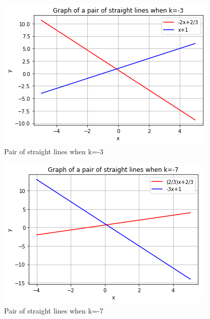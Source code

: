 \documentclass[journal,13pt,twocolumn]{IEEEtran}
\begin{document}
\begin{figure}[!htb]
   \centering
   \includegraphics[width=\columnwidth]{fig1.png}
   \caption{Pair of straight lines when k=-3}
   \label{fig:1}
\end{figure}
\begin{figure}[!htb]
   \includegraphics[width=\columnwidth]{fig2..png}
   \caption{Pair of straight lines when k=-7}
   \label{fig:2}
\end{figure}
\end{document}

